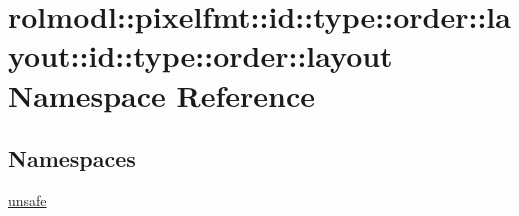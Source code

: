 \hypertarget{namespacerolmodl_1_1pixelfmt_1_1id_1_1type_1_1order_1_1layout_1_1id_1_1type_1_1order_1_1layout}{}\section{rolmodl\+::pixelfmt\+::id\+::type\+::order\+::layout\+::id\+::type\+::order\+::layout Namespace Reference}
\label{namespacerolmodl_1_1pixelfmt_1_1id_1_1type_1_1order_1_1layout_1_1id_1_1type_1_1order_1_1layout}
\subsection*{Namespaces}
\begin{DoxyCompactItemize}
\item 
 \mbox{\hyperlink{namespacerolmodl_1_1pixelfmt_1_1id_1_1type_1_1order_1_1layout_1_1id_1_1type_1_1order_1_1layout_1_1unsafe}{unsafe}}
\end{DoxyCompactItemize}
